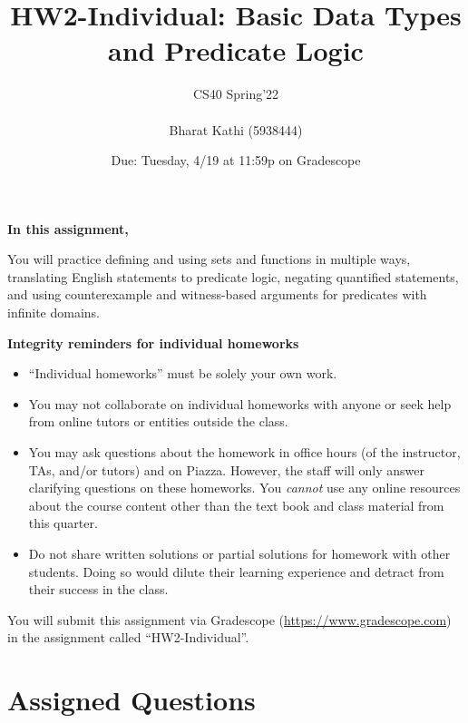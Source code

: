 \documentclass[12pt, oneside]{article}
\title{HW2-Individual: Basic Data Types and Predicate Logic}
\author{CS40 Spring'22\\\\
Bharat Kathi (5938444)}
\date{Due: Tuesday, 4/19 at 11:59p on Gradescope}
\begin{document}
\maketitle

{\bf In this assignment,}

You will practice defining and using sets and functions in multiple ways, translating English statements to predicate logic, negating quantified statements, and using counterexample and witness-based arguments for predicates with infinite domains.


{\bf Integrity reminders for individual homeworks}
\begin{itemize}
\item ``Individual homeworks'' must be solely your own work. 
\item You may not collaborate on individual homeworks with anyone or seek help from online tutors or entities outside the class.
\item You may ask questions about the homework in office hours (of the instructor, TAs, and/or tutors) and 
on Piazza.  However, the staff will only answer clarifying questions on these homeworks. You \emph{cannot} use any online resources about the course content other than the text
book and class material from this quarter.
\item Do not share written solutions or partial solutions for homework with other students. Doing so would dilute their learning experience and detract from their success in the class.
\end{itemize}


You will submit this assignment via Gradescope
(\href{https://www.gradescope.com}{https://www.gradescope.com}) in the assignment called ``HW2-Individual''.

\section*{Assigned Questions}
\end{document}
